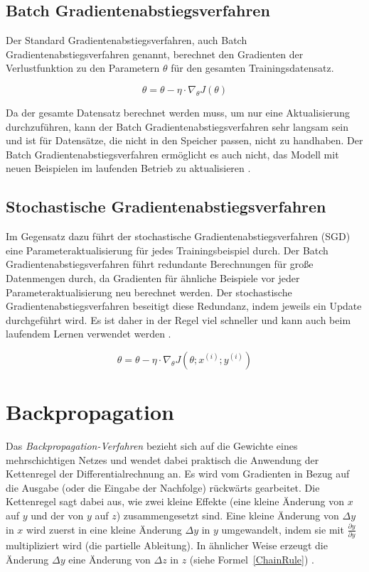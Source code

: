 \subsection{Batch Gradientenabstiegsverfahren}
Der Standard Gradientenabstiegsverfahren, auch Batch Gradientenabstiegsverfahren genannt, berechnet den Gradienten der Verlustfunktion zu den Parametern $\theta$ für den gesamten Trainingsdatensatz.


\begin{equation} \label{FormelGradBatch}
    \theta = \theta - \eta \cdot \nabla_{\theta}J(\theta)
\end{equation}

Da der gesamte Datensatz berechnet werden muss, um nur eine Aktualisierung durchzuführen, kann der Batch Gradientenabstiegsverfahren sehr langsam sein und ist für Datensätze, die nicht in den Speicher passen, nicht zu handhaben. Der Batch Gradientenabstiegsverfahren ermöglicht es auch nicht, das Modell mit neuen Beispielen im laufenden Betrieb zu aktualisieren \cite*{Ruder2016}.

\subsection{Stochastische Gradientenabstiegsverfahren}

Im Gegensatz dazu führt der stochastische Gradientenabstiegsverfahren (SGD) eine Parameteraktualisierung für jedes Trainingsbeispiel durch. Der Batch Gradientenabstiegsverfahren führt redundante Berechnungen für große Datenmengen durch, da Gradienten für ähnliche Beispiele vor jeder Parameteraktualisierung neu berechnet werden. Der stochastische Gradientenabstiegsverfahren beseitigt diese Redundanz, indem jeweils ein Update durchgeführt wird. Es ist daher in der Regel viel schneller und kann auch beim laufendem Lernen verwendet werden \cite*{Ruder2016}.

\begin{equation} \label{FormelGradStoch}
    \theta = \theta - \eta \cdot \nabla_{\theta}J(\theta;x^{(i)};y^{(i)})
\end{equation}



\section{Backpropagation}
Das \textit{Backpropagation-Verfahren} bezieht sich auf die Gewichte eines mehrschichtigen Netzes und wendet dabei praktisch die Anwendung der Kettenregel der Differentialrechnung an. Es wird vom Gradienten in Bezug auf die Ausgabe (oder die Eingabe der Nachfolge) rückwärts gearbeitet. Die Kettenregel sagt dabei aus, wie zwei kleine Effekte (eine kleine Änderung von $x$ auf $y$ und der von $y$ auf $z$) zusammengesetzt sind. Eine kleine Änderung von $\Delta y$ in $x$ wird zuerst in eine kleine Änderung $\Delta y$ in $y$ umgewandelt, indem sie mit $\frac{\partial y}{\partial y}$  multipliziert wird (die partielle Ableitung). In ähnlicher Weise erzeugt die Änderung $\Delta y$ eine Änderung von $\Delta z$ in $z$ (siehe Formel~\ref{ChainRule}) \cite*{Lecun2015}.

